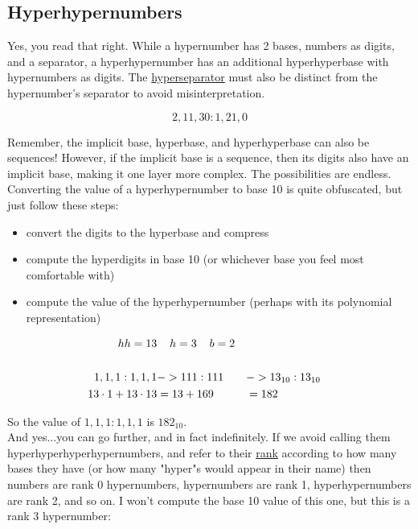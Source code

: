 \documentclass{article}
\begin{document}
\subsection*{Hyperhypernumbers}

Yes, you read that right. While a hypernumber has 2 bases, numbers as digits, and a separator, a hyperhypernumber has an additional hyperhyperbase with hypernumbers as digits. The \underline{hyperseparator} must also be distinct from the hypernumber's separator to avoid misinterpretation.

$$2,11,30 : 1, 21, 0$$

\noindent Remember, the implicit base, hyperbase, and hyperhyperbase can also be sequences! However, if the implicit base is a sequence, then its digits also have an implicit base, making it one layer more complex. The possibilities are endless. Converting the value of a hyperhypernumber to base 10 is quite obfuscated, but just follow these steps:

\begin{itemize}
\item convert the digits to the hyperbase and compress
\item compute the hyperdigits in base 10 (or whichever base you feel most comfortable with)
\item compute the value of the hyperhypernumber (perhaps with its polynomial representation)
\end{itemize}

\begin{align*}
hh = 13 &\hspace{4mm} h = 3 \hspace{4mm} b = 2\\
\\
1,1,1 : 1, 1, 1 &-> 111:111 &&-> 13_{10} : 13_{10}\\
13 \cdot 1 + 13 \cdot 13 &= 13 + 169 &&= 182
\end{align*}

\noindent So the value of $1,1,1:1,1,1$ is $182_{10}$.\\

\noindent And yes...you can go further, and in fact indefinitely. If we avoid calling them hyperhyperhyperhypernumbers, and refer to their \underline{rank} according to how many bases they have (or how many "hyper"s would appear in their name) then numbers are rank 0 hypernumbers, hypernumbers are rank 1, hyperhypernumbers are rank 2, and so on. I won't compute the base 10 value of this one, but this is a rank 3 hypernumber:
\end{document}
